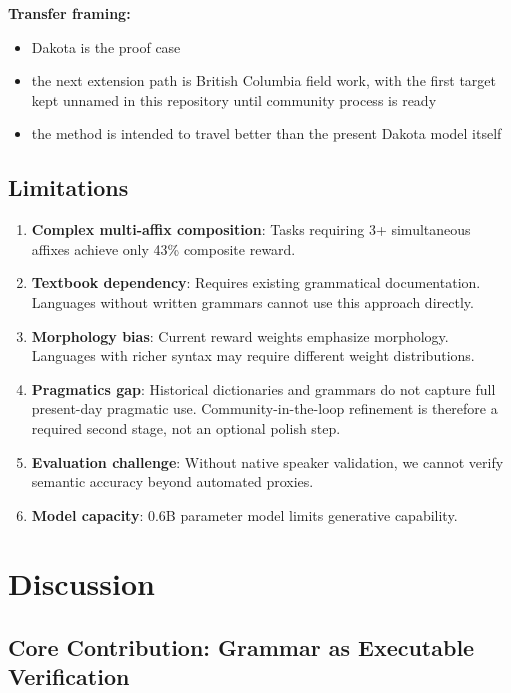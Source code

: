\documentclass{article}
\begin{document}
\textbf{Transfer framing:}
\begin{itemize}
    \item Dakota is the proof case
    \item the next extension path is British Columbia field work, with the first target kept unnamed in this repository until community process is ready
    \item the method is intended to travel better than the present Dakota model itself
\end{itemize}

\subsection{Limitations}

\begin{enumerate}
    \item \textbf{Complex multi-affix composition}: Tasks requiring 3+ simultaneous affixes achieve only 43\% composite reward.
    
    \item \textbf{Textbook dependency}: Requires existing grammatical documentation. Languages without written grammars cannot use this approach directly.
    
    \item \textbf{Morphology bias}: Current reward weights emphasize morphology. Languages with richer syntax may require different weight distributions.
    
    \item \textbf{Pragmatics gap}: Historical dictionaries and grammars do not capture full present-day pragmatic use. Community-in-the-loop refinement is therefore a required second stage, not an optional polish step.
    
    \item \textbf{Evaluation challenge}: Without native speaker validation, we cannot verify semantic accuracy beyond automated proxies.
    
    \item \textbf{Model capacity}: 0.6B parameter model limits generative capability.
\end{enumerate}

\section{Discussion}

\subsection{Core Contribution: Grammar as Executable Verification}
\end{document}
